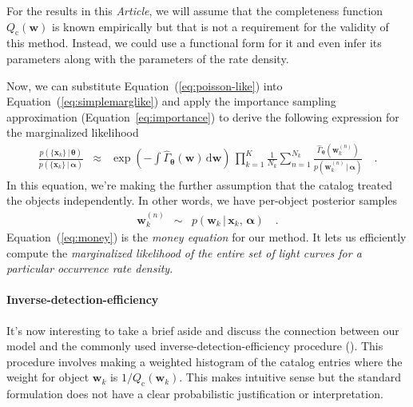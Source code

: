 \documentclass[12pt,preprint]{aastex}
\newcommand{\paper}{\textsl{Article}}
\newcommand{\Eq}[1]{Equation~(\ref{eq:#1})}
\newcommand{\eq}[1]{\Eq{#1}}
\newcommand{\eqalt}[1]{Equation~\ref{eq:#1}}
\newcommand{\eqlabel}[1]{\label{eq:#1}}
\newcommand{\dd}{\ensuremath{\,\mathrm{d}}}
\newcommand{\bvec}[1]{\ensuremath{\boldsymbol{#1}}}
\newcommand{\rate}{\ensuremath{\Gamma}}
\newcommand{\ratepar}{{\ensuremath{\theta}}}
\newcommand{\ratepars}{{\ensuremath{\bvec{\ratepar}}}}
\newcommand{\obs}[1]{\ensuremath{\hat{#1}}}
\newcommand{\completeness}{{\ensuremath{Q_\mathrm{c}}}}
\newcommand{\data}{{\ensuremath{\bvec{x}}}}
\newcommand{\entry}{{\ensuremath{\bvec{w}}}}
\newcommand{\interim}{{\ensuremath{\bvec{\alpha}}}}
\begin{document}
For the results in this \paper, we will assume that the completeness function
$\completeness(\entry)$ is known empirically but that is not a requirement for
the validity of this method.
Instead, we could use a functional form for it and even infer its parameters
along with the parameters of the rate density.

Now, we can substitute \eq{poisson-like} into \eq{simplemarglike} and apply
the importance sampling approximation (\eqalt{importance}) to derive the
following expression for the marginalized likelihood
\begin{eqnarray}\eqlabel{money}
\frac{p(\{\data_k\}\,|\,\ratepars)}{p(\{\data_k\}\,|\,\interim)} &\approx&
    \exp\left(-\int \obs{\rate}_\ratepars (\entry) \dd\entry\right) \,
    \prod_{k=1}^K
    \frac{1}{N_k} \sum_{n=1}^{N_k}
    \frac{\obs{\rate}_\ratepars (\entry_k^{(n)})}
         {p(\entry_k^{(n)}\,|\,\interim)} \quad.
\end{eqnarray}
In this equation, we're making the further assumption that the catalog treated
the objects independently.
In other words, we have per-object posterior samples
\begin{eqnarray}
\entry_k^{(n)} &\sim& p(\entry_k\,|\,\data_k,\,\interim) \quad.
\end{eqnarray}
\Eq{money} is the \emph{money equation} for our method.
It lets us efficiently compute the \emph{marginalized likelihood of the entire
set of light curves for a particular occurrence rate density}.

\paragraph{Inverse-detection-efficiency}
It's now interesting to take a brief aside and discuss the connection between
our model and the commonly used inverse-detection-efficiency procedure
(\citealt{howard,dressing,petigura}).
This procedure involves making a weighted histogram of the catalog entries
where the weight for object $\entry_k$ is $1/\completeness(\entry_k)$.
This makes intuitive sense but the standard formulation does not have a clear
probabilistic justification or interpretation.
\end{document}
